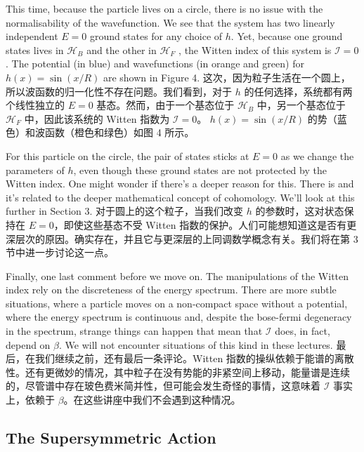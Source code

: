 \documentclass{article}
\begin{document}
\begin{paracol}{2}
This time, because the particle lives on a circle, there is no issue with the normalisability of the wavefunction. We see that the system has two linearly independent $E = 0$ ground states for any choice of $h$. Yet, because one ground states lives in $\mathcal{H}_B$ and the other in $\mathcal{H}_F$ , the Witten index of this system is $\mathcal{I} = 0$. The potential (in blue) and wavefunctions (in orange and green) for $h(x) = \sin(x / R)$ are shown in Figure 4.
\switchcolumn
这次，因为粒子生活在一个圆上，所以波函数的归一化性不存在问题。我们看到，对于 $h$ 的任何选择，系统都有两个线性独立的 $E = 0$ 基态。然而，由于一个基态位于 $\mathcal{H}_B$ 中，另一个基态位于 $\mathcal{H}_F$ 中，因此该系统的 Witten 指数为 $\mathcal{I} = 0$。 $h(x) = \sin(x / R)$ 的势（蓝色）和波函数（橙色和绿色）如图 4 所示。
\switchcolumn*

For this particle on the circle, the pair of states sticks at $E = 0$ as we change the parameters of $h$, even though these ground states are not protected by the Witten index. One might wonder if there's a deeper reason for this. There is and it's related to the deeper mathematical concept of cohomology. We'll look at this further in Section 3.
\switchcolumn
对于圆上的这个粒子，当我们改变 $h$ 的参数时，这对状态保持在 $E = 0$，即使这些基态不受 Witten 指数的保护。人们可能想知道这是否有更深层次的原因。确实存在，并且它与更深层的上同调数学概念有关。我们将在第 3 节中进一步讨论这一点。
\switchcolumn*

Finally, one last comment before we move on. The manipulations of the Witten index rely on the discreteness of the energy spectrum. There are more subtle situations, where a particle moves on a non-compact space without a potential, where the energy spectrum is continuous and, despite the bose-fermi degeneracy in the spectrum, strange things can happen that mean that $\mathcal{I}$ does, in fact, depend on $\beta$. We will not encounter situations of this kind in these lectures.
\switchcolumn
最后，在我们继续之前，还有最后一条评论。Witten 指数的操纵依赖于能谱的离散性。还有更微妙的情况，其中粒子在没有势能的非紧空间上移动，能量谱是连续的，尽管谱中存在玻色费米简并性，但可能会发生奇怪的事情，这意味着 $\mathcal{I}$ 事实上，依赖于 $\beta$。在这些讲座中我们不会遇到这种情况。
\switchcolumn*

\subsection{The Supersymmetric Action}
\switchcolumn

\end{paracol}
\end{document}
